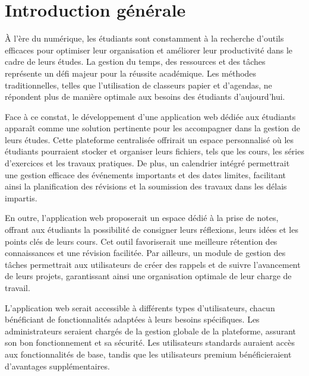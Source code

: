 \chapter*{Introduction générale}
\label{chap:introduction}
À l'ère du numérique, les étudiants sont constamment à la recherche d'outils efficaces pour optimiser leur organisation et améliorer leur productivité dans le cadre de leurs études. La gestion du temps, des ressources et des tâches représente un défi majeur pour la réussite académique. Les méthodes traditionnelles, telles que l'utilisation de classeurs papier et d'agendas, ne répondent plus de manière optimale aux besoins des étudiants d'aujourd'hui.
\par
\vspace{2mm}
Face à ce constat, le développement d'une application web dédiée aux étudiants apparaît comme une solution pertinente pour les accompagner dans la gestion de leurs études. Cette plateforme centralisée offrirait un espace personnalisé où les étudiants pourraient stocker et organiser leurs fichiers, tels que les cours, les séries d'exercices et les travaux pratiques. De plus, un calendrier intégré permettrait une gestion efficace des événements importants et des dates limites, facilitant ainsi la planification des révisions et la soumission des travaux dans les délais impartis.
\par
\vspace{2mm}
En outre, l'application web proposerait un espace dédié à la prise de notes, offrant aux étudiants la possibilité de consigner leurs réflexions, leurs idées et les points clés de leurs cours. Cet outil favoriserait une meilleure rétention des connaissances et une révision facilitée. Par ailleurs, un module de gestion des tâches permettrait aux utilisateurs de créer des rappels et de suivre l'avancement de leurs projets, garantissant ainsi une organisation optimale de leur charge de travail.
\par
\vspace{2mm}
L'application web serait accessible à différents types d'utilisateurs, chacun bénéficiant de fonctionnalités adaptées à leurs besoins spécifiques. Les administrateurs seraient chargés de la gestion globale de la plateforme, assurant son bon fonctionnement et sa sécurité. Les utilisateurs standards auraient accès aux fonctionnalités de base, tandis que les utilisateurs premium bénéficieraient d'avantages supplémentaires.
\par
